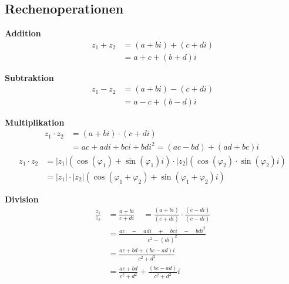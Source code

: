 \documentclass[german]{latex4ei/latex4ei_sheet}
\begin{document}
\begin{sectionbox}

\subsection{Rechenoperationen}
\begin{minipage}{0.49\textwidth}
	\textbf{Addition}
\begin{align*}
	 { z }_{ 1 } + { z }_{ 2 } &= \left(a + bi\right) + \left(c + di \right)\\
	 &= a + c + (b + d)i
	\end{align*}
\end{minipage}
\begin{minipage}{0.49\textwidth}
	\textbf{Subtraktion}
	\begin{align*}
	 { z }_{ 1 } - { z }_{ 2 } &= \left(a + bi \right) - \left(c + di \right)\\
	 &= a - c + (b - d)i
	\end{align*}
\end{minipage}

\textbf{Multiplikation}
\begin{align*}
	 { z }_{ 1 } \cdot  { z }_{ 2 } &= \left(a + bi \right) \cdot \left(c + di \right) \\
	 &= ac + adi + bci + bd { i }^{ 2 } = \left(ac - bd\right) + \left(ad + bc\right)i\
	\end{align*}
	\begin{align*}
	{ z }_{ 1 }\cdot { z }_{ 2 } & =\left| { z }_{ 1 } \right| \left( \cos { \left( { \varphi  }_{ 1 } \right)  } +\sin { \left( { \varphi  }_{ 1 } \right)  } i \right) \cdot \left| { z }_{ 2 } \right| \left( \cos { \left( { \varphi  }_{ 2 } \right)  } \cdot \sin { \left( { \varphi  }_{ 2 } \right)  } i \right) \\ 
	& =\left| { z }_{ 1 } \right| \cdot \left| { z }_{ 2 } \right| \left( \cos { \left( { \varphi  }_{ 1 } + { \varphi  }_{ 2 } \right)  } +\sin { \left( { \varphi  }_{ 1 } + { \varphi  }_{ 2 } \right)  } i \right)
	\end{align*}

\textbf{Division}
\begin{align*}
\frac { z_{ 1 } }{ z_{ 2 } } &=\frac { a+bi }{ c+di } \quad =\frac { \left( a+bi \right)  }{ \left( c+di \right)  } \cdot \frac { \left( c-di \right)  }{ \left( c-di \right)  } \\ 
&=\frac { ac\quad -\quad adi\quad +\quad bci\quad -\quad bd{ i }^{ 2 } }{ { c }^{ 2 }-{ \left( di \right)  }^{ 2 } } \\ 
&=\frac { ac+bd+\left( bc-ad \right) i }{ { c }^{ 2 }+{ d }^{ 2 } } \\ 
&=\frac { ac+bd }{ { c }^{ 2 }+{ d }^{ 2 } } +\frac { \left( bc-ad \right)  }{ { c }^{ 2 }+{ d }^{ 2 } }  i
\end{align*}


\end{sectionbox}
\end{document}
